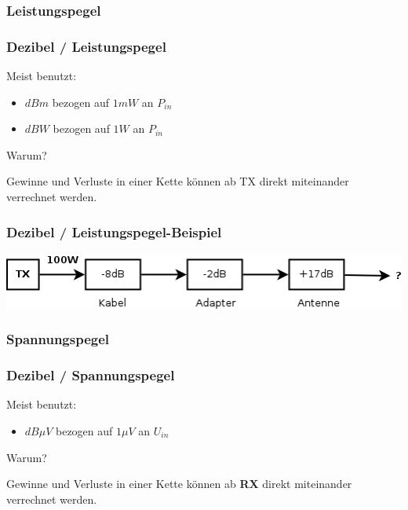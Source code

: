 \subsubsection{Leistungspegel}

\begin{frame}
  \frametitle{Dezibel / Leistungspegel}

  Meist benutzt:

  \begin{itemize}
    \item $dBm$ bezogen auf $1 mW$ an $P_{in}$
    \item $dBW$ bezogen auf $1 W$ an $P_{in}$
  \end{itemize}

  \begin{center}
    Warum?
  \end{center}

  \pause

  Gewinne und Verluste in einer Kette können ab TX direkt miteinander
  verrechnet werden.

\end{frame}

\begin{frame}
  \frametitle{Dezibel / Leistungspegel-Beispiel}

  \includegraphics[width=1\textwidth]{a01/TX-Pfad}

  \vspace{3em}


\end{frame}

\subsubsection{Spannungspegel}

\begin{frame}
  \frametitle{Dezibel / Spannungspegel}

  Meist benutzt:

  \begin{itemize}
    \item $dB \mu V$ bezogen auf $1 \mu V$ an $U_{in}$
  \end{itemize}

  \begin{center}
    Warum?
  \end{center}

  \pause

  Gewinne und Verluste in einer Kette können ab \textbf{RX} direkt miteinander
  verrechnet werden.

\end{frame}

